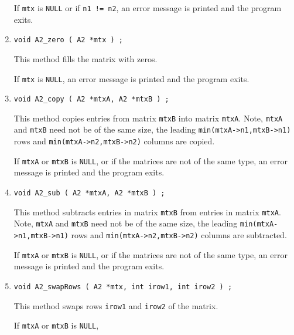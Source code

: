 \begin{enumerate}
If {\tt mtx} is {\tt NULL} or if {\tt n1 != n2},
an error message is printed and the program exits.
\item
\begin{verbatim}
void A2_zero ( A2 *mtx ) ;
\end{verbatim}
This method fills the matrix with zeros.
\par {}
If {\tt mtx} is {\tt NULL},
an error message is printed and the program exits.
\item
\begin{verbatim}
void A2_copy ( A2 *mtxA, A2 *mtxB ) ;
\end{verbatim}
This method copies entries from matrix {\tt mtxB} 
into matrix {\tt mtxA}.
Note, {\tt mtxA} and {\tt mtxB} need not be of the same size,
the leading {\tt min(mtxA->n1,mtxB->n1)} rows
and {\tt min(mtxA->n2,mtxB->n2)} columns are copied.
\par {}
If {\tt mtxA} or {\tt mtxB} is {\tt NULL},
or if the matrices are not of the same type,
an error message is printed and the program exits.
\item
\begin{verbatim}
void A2_sub ( A2 *mtxA, A2 *mtxB ) ;
\end{verbatim}
This method subtracts entries in matrix {\tt mtxB} 
from entries in matrix {\tt mtxA}.
Note, {\tt mtxA} and {\tt mtxB} need not be of the same size,
the leading {\tt min(mtxA->n1,mtxB->n1)} rows
and {\tt min(mtxA->n2,mtxB->n2)} columns are subtracted.
\par {}
If {\tt mtxA} or {\tt mtxB} is {\tt NULL},
or if the matrices are not of the same type,
an error message is printed and the program exits.
\item
\begin{verbatim}
void A2_swapRows ( A2 *mtx, int irow1, int irow2 ) ;
\end{verbatim}
This method swaps rows {\tt irow1} and {\tt irow2} of the matrix.
\par {}
If {\tt mtxA} or {\tt mtxB} is {\tt NULL},

\end{enumerate}

